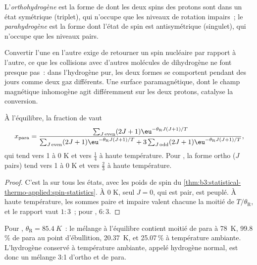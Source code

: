 \begin{definition}\label{def:b3:statistical-thermo-applied:spin-isomers}
L'\emph{orthohydrogène} est la forme
de  dont les deux spins des protons sont dans un état symétrique
(triplet), qui n'occupe que les niveaux de rotation impairs~; le
\emph{parahydrogène} est la forme dont
l'état de spin est antisymétrique (singulet), qui n'occupe que les
niveaux pairs.
\end{definition}

Convertir l'une en l'autre exige de retourner un spin nucléaire par
rapport à l'autre, ce que les collisions avec d'autres molécules de
dihydrogène ne font presque pas~: dans l'hydrogène pur, les deux formes
se comportent pendant des jours comme deux gaz différents. Une surface
paramagnétique, dont le champ magnétique inhomogène agit différemment sur
les deux protons, catalyse la conversion.

\begin{proposition}\label{prop:b3:statistical-thermo-applied:ortho-para}
À l'équilibre, la fraction de  vaut
\[
  x_{\mathrm{para}} = \frac{\sum_{J\,\mathrm{even}}(2J+1)\eu^{-\theta_{\mathrm R}J(J+1)/T}}
    {\sum_{J\,\mathrm{even}}(2J+1)\eu^{-\theta_{\mathrm R}J(J+1)/T} + 3\sum_{J\,\mathrm{odd}}(2J+1)\eu^{-\theta_{\mathrm R}J(J+1)/T}},
\]
qui tend vers 1 à 0 K et vers $\frac14$ à haute température. Pour
, la forme ortho
($J$ pairs) tend vers 1 à 0 K et vers $\frac23$ à haute température.
\end{proposition}

\begin{proof}
C'est la  sur tous les états, avec les poids de
spin du
\cref{thm:b3:statistical-thermo-applied:spin-statistics}. À 0 K, seul
$J = 0$, qui est pair, est peuplé. À haute température, les sommes paire
et impaire valent chacune la moitié
de $T/\theta_{\mathrm R}$, et le rapport vaut $1 : 3$~; pour , $6 : 3$.
\end{proof}

Pour , $\theta_{\mathrm R} = \qty{85.4}{K}$~: le mélange à
l'équilibre contient moitié de para à \qty{78}{K},
99.8\,\% de para au point d'ébullition, \qty{20.37}{K}, et 25.07\,\% à
température ambiante. L'hydrogène conservé à température ambiante,
appelé hydrogène normal, est donc un mélange 3:1 d'ortho et de para.

